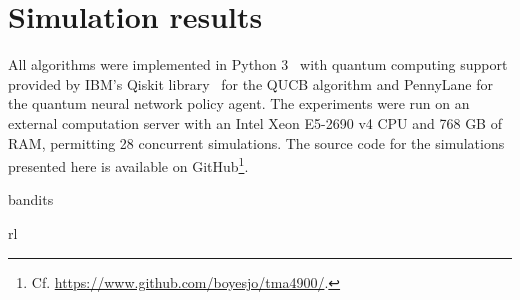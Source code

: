 \chapter{Simulation results}
\label{chap:simulations}

All algorithms were implemented in Python 3~\autocite{python} with quantum computing support provided by IBM's Qiskit library~\autocite{qiskit} for the QUCB algorithm and PennyLane for the quantum neural network policy agent.
The experiments were run on an external computation server with an Intel Xeon E5-2690 v4 CPU and 768 GB of RAM, permitting 28 concurrent simulations.
The source code for the simulations presented here is available on GitHub\footnote{
    Cf. \url{https://www.github.com/boyesjo/tma4900/}.
}.



{bandits}
\clearpage



{rl}
